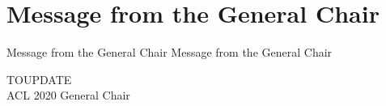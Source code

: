 \section{Message from the General Chair}\vspace{2em}
\setheaders%
    {Message from the General Chair}%
    {Message from the General Chair}
\thispagestyle{emptyheader}

\setlength{\parskip}{.7ex}

TOUPDATE \\

\vspace{1.0em} 
\noindent ACL 2020 General Chair\\

